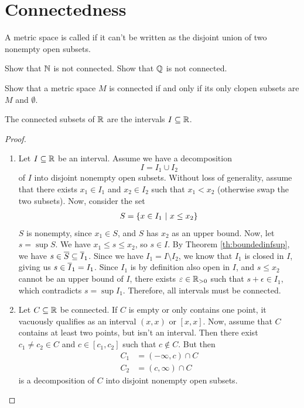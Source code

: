 \section{Connectedness}
\begin{importantdefinition}{}{}
	A metric space is called  if it can't be written as the disjoint union of two nonempty open subsets.
\end{importantdefinition}
\begin{exercise}
	Show that $\mathbb{N}$ is not connected. Show that $\mathbb{Q}$ is not connected.
\end{exercise}
\begin{exercise}
	Show that a metric space $M$ is connected if and only if its only clopen subsets are $M$ and $\emptyset$.
\end{exercise}
\begin{theorem}
	The connected subsets of $\mathbb{R}$ are the intervals $I \subseteq \mathbb{R}$.
\end{theorem}
\begin{proof}
	\begin{enumerate}
		\item Let $I \subseteq \mathbb{R}$ be an interval. Assume we have a decomposition $$I = I_1 \cup I_2$$ of $I$ into disjoint nonempty open subsets. Without loss of generality, assume that there exists $x_1 \in I_1$ and $x_2 \in I_2$ such that $x_1 < x_2$ (otherwise swap the two subsets).
		Now, consider the set 
		\begin{align*}
			S = \qty{x \in I_1 ~\middle|~x \leq x_2}
		\end{align*}
		$S$ is nonempty, since $x_1 \in S$, and $S$ has $x_2$ as an upper bound. Now, let $s = \sup S$. We have $x_1 \leq s \leq x_2$, so $s \in I$. By Theorem \ref{th:boundedinfsup}, we have $s \in \overline{{S}} \subseteq \overline{{I}}_1$. 
		\newpar
		Since we have $I_1 = I \setminus I_2$, we know that $I_1$ is closed in $I$, giving us $s \in \overline{{I}}_1 = I_1$.
		\newpar 
		Since $I_1$ is by definition also open in $I$, and $s \leq x_2$ cannot be an upper bound of $I$, there exists $\varepsilon \in \mathbb{R}_{> 0}$ such that $s + \epsilon \in I_1$, which contradicts $s = \sup I_1$. Therefore, all intervals must be connected.
		\item Let $C \subseteq \mathbb{R}$ be connected. If $C$ is empty or only contains one point, it vacuously qualifies as an interval $(x,x)$ or $[x,x]$. Now, assume that $C$ contains at least two points, but isn't an interval. Then there exist $c_1 \neq c_2 \in C$ and $c \in [c_1, c_2]$ such that $c \notin C$. But then
		\begin{align*}
			C_1 &= (-\infty, c) \cap C\\
			C_2 &= (c, \infty) \cap C
		\end{align*}
		is a decomposition of $C$ into disjoint nonempty open subsets.
	\end{enumerate}
\end{proof}
